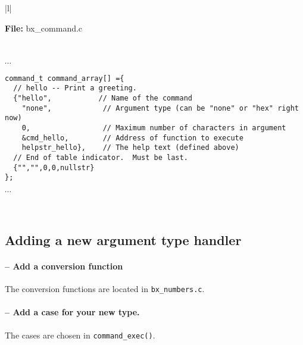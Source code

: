 \begin{center}
  \vspace{-\baselineskip}
  \begin{tabular}{|l|} \hline
    \begin{minipage}[c]{\textwidth - 2\tabcolsep}
      \textbf{File:}
      bx\_command.c
    \end{minipage}\\
    \begin{minipage}[c]{\textwidth - 2\tabcolsep}
      \vspace{0.5\baselineskip}
      $\cdots$ \\
      \begin{minipage}[c]{\textwidth - 2\tabcolsep}
        \lstset{language=c}
        \begin{lstlisting}
command_t command_array[] ={
  // hello -- Print a greeting.
  {"hello",           // Name of the command
    "none",            // Argument type (can be "none" or "hex" right now)
    0,                 // Maximum number of characters in argument
    &cmd_hello,        // Address of function to execute
    helpstr_hello},    // The help text (defined above)  
  // End of table indicator.  Must be last.
  {"","",0,0,nullstr}
};      
\end{lstlisting}
      \end{minipage}
      $\cdots$\\
      \vspace{-0.5\baselineskip}
    \end{minipage}\\
    \hline
  \end{tabular}
\end{center}

\clearpage
\subsection{Adding a new argument type handler}
\setcounter{handcount}{0}

\paragraph{ --  Add a conversion function}
The conversion functions are located in \texttt{bx\_numbers.c}.  

\paragraph{ -- Add a case for your new type.}
The cases are chosen in \texttt{command\_exec()}.

